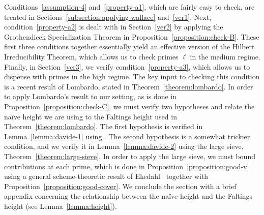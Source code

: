 Conditions~\ref{assumption-4} and~\ref{property-a1}, which are fairly easy to check, are treated in Sections~\ref{subsection:applying-wallace} and~\ref{ver1}. Next, condition~\ref{property-a2}
is dealt with in Section~\ref{ver2} by applying the Grothendieck Specialization Theorem in
Proposition~\ref{proposition:check-B}.
These first three conditions together essentially yield an effective
version of the Hilbert Irreducibility Theorem, which allows us to
check primes $\ell$ in the medium regime. Finally, in Section~\ref{ver3}, we verify condition~\ref{property-a3},
which allows us to dispense with primes in the high regime.
The key input to checking this condition is a recent result of Lombardo,
stated in Theorem~\ref{theorem:lombardo}.
In order to apply Lombardo's result to our setting,
as is done in Proposition~\ref{proposition:check-C}, we must verify two hypotheses and relate the na\"{i}ve height we are using to the Faltings height used in Theorem~\ref{theorem:lombardo}.
The first hypothesis is verified in Lemma~\ref{lemma:davide-1}
using \cite[Proposition 5]{ellenbergEHK:non-simple-abelian-varieties-in-a-family}.
The second hypothesis is a somewhat trickier condition, and we verify it in Lemma~\ref{lemma:davide-2} using the large sieve,
Theorem~\ref{theorem:large-sieve}.
In order to apply the large sieve, we must bound contributions at
each prime, which is done in
Proposition~\ref{proposition:good-v} using a general scheme-theoretic
result of Ekedahl~\cite[Lemma 1.2]{ekedahl1988effective}
together with Proposition~\ref{proposition:good-cover}.
We conclude the section with a brief appendix concerning the relationship between the na\"{i}ve height and the Faltings height (see Lemma~\ref{lemma:height}).


